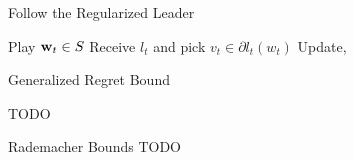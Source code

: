 \begin{frame}{Follow the Regularized Leader}
  \begin{algorithmic}
    \State Play $\operatorname{\mathbf{w}}_t \in S$
    \State Receive $l_t$ and pick $v_t \in \partial l_t(w_t)$
    \State Update,
    \EndFor
  \end{algorithmic}
\end{frame}

\begin{frame}{Generalized Regret Bound}
  \begin{theorem}
    TODO
  \end{theorem}
\end{frame}

\begin{frame}{Rademacher Bounds}
  TODO
\end{frame}
